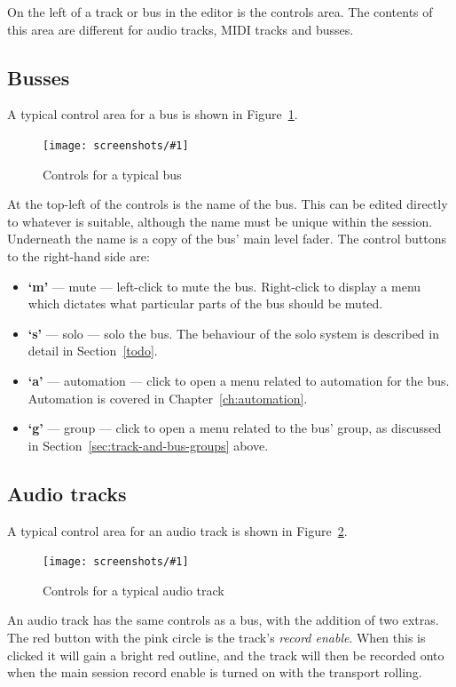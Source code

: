 \documentclass[10pt,a4paper]{book}
\newcommand{\todo}[1]{\marginpar{\small\texttt{#1}}}
\newcommand{\screenshot}[3]{%
\begin{figure}[ht]%
\begin{center}
\texttt{[image: screenshots/\#1]}
\end{center}
\caption{#2}
\label{#3}
\end{figure}}
\begin{document}
On the left of a track or bus in the editor is the controls area.  The
contents of this area are different for audio tracks, MIDI tracks and busses.

\subsection{Busses}

A typical control area for a bus is shown in
Figure~\ref{fig:typical-bus-controls}.

\screenshot{typical-bus-controls.png}{Controls for a typical bus}{fig:typical-bus-controls}

At the top-left of the controls is the name of the bus.  This can be
edited directly to whatever is suitable, although the name must be
unique within the session.  Underneath the name is a copy of the bus'
main level fader.  The control buttons to the right-hand side are:

\begin{itemize}
\item \textbf{`m'} --- mute --- left-click to mute the bus.
  Right-click to display a menu which dictates what particular parts
  of the bus should be muted. \todo{detail of muting options}
\item \textbf{`s'} --- solo --- solo the bus.  The behaviour of the
  solo system is described in detail in Section~\ref{todo}.
\item \textbf{`a'} --- automation --- click to open a menu related to
  automation for the bus.  Automation is covered in Chapter~\ref{ch:automation}.
\item \textbf{`g'} --- group --- click to open a menu related to the
  bus' group, as discussed in Section~\ref{sec:track-and-bus-groups} above.
\end{itemize}


\subsection{Audio tracks}

A typical control area for an audio track is shown in Figure~\ref{fig:typical-audio-track-controls}.

\screenshot{typical-audio-track-controls.png}{Controls for a typical audio track}{fig:typical-audio-track-controls}

An audio track has the same controls as a bus, with the addition of
two extras.  The red button with the pink circle is the track's
\emph{record enable}.  When this is clicked it will gain a bright red
outline, and the track will then be recorded onto when the main
session record enable is turned on with the transport rolling.
\end{document}
